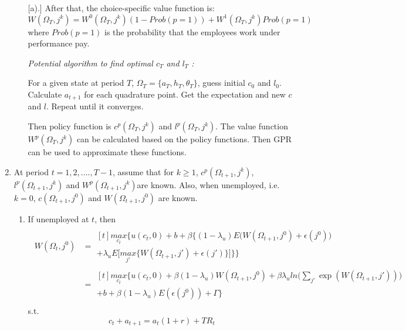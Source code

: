 \documentclass{article}
\begin{document}
\begin{enumerate}[{}1{).}]
\begin{enumerate} [{}a{).}]
					After that, the choice-specific value function is:
						$$ W(\Omega_{T}, j^k) = W^0(\Omega_{T}, j^k)(1 - Prob(p=1)) +  W^1(\Omega_{T}, j^k)Prob(p=1) $$
					where $Prob(p=1)$ is the probability that the employees work under performance pay. \par
					\textit{Potential algorithm to find optimal $c_T$ and $l_T$ :} \par
					For a given state at period $T$, $\Omega_T=\{a_T, h_T, \theta_T\}$, guess initial $c_0$ and $l_0$. Calculate $a_{t+1}$ for each quadrature point. Get the expectation and new $c$ and $l$. Repeat until it converges. \par
					Then policy function is $c^p(\Omega_T, j^k)$ and $l^p(\Omega_T, j^k)$. The value function $W^p(\Omega_{T}, j^k)$ can be calculated based on the policy functions. Then GPR can be used to approximate these functions. 
				\end{enumerate}  
			\item At period $t = 1, 2, ...., T-1$, assume that for $k \geq 1$, $c^p(\Omega_{t+1}, j^k)$, $l^p(\Omega_{t+1}, j^k)$ and $W^p(\Omega_{t+1}, j^k)$are known. Also, when unemployed, i.e. $k=0$, $c(\Omega_{t+1}, j^0)$ and $W(\Omega_{t+1}, j^0)$ are known.
				
				\begin{enumerate}[{}a{).}]
					\item If unemployed at $t$, then
						\begin{align*}
							\begin{split}
								W(\Omega_{t}, j^0) &=
									\begin{multlined}[t]
										\underset{c_t}{max}\Bigg\{u(c_t, 0) + b + \beta\bigg\{(1-\lambda_u)E\Big(W(\Omega_{t+1}, j^0) + \epsilon(j^0)\Big) \\ 
										+ \lambda_u E\Big[\underset{j'}{max}\big\{W(\Omega_{t+1}, j') + \epsilon(j') \big\}\Big] \bigg\} \Bigg\} 
									\end{multlined} \\
									&=
									\begin{multlined}[t]
										\underset{c_t}{max}\bigg\{u(c_t, 0) + \beta(1-\lambda_u) W(\Omega_{t+1}, j^0) + \beta \lambda_u ln\Big(\sum_{j'}\exp(W(\Omega_{t+1}, j'))\Big) \\ + b + \beta(1-\lambda_u)E(\epsilon(j^0)) + \Gamma \bigg\} 
									\end{multlined}
							\end{split}
						\end{align*}
					s.t. 
						$$c_t + a_{t+1} =  a_t(1+r)  + TR_t$$
					

\end{enumerate}
\end{enumerate}
\end{document}
